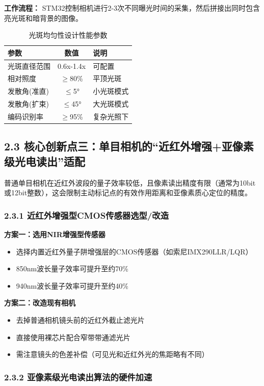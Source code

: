 \documentclass[12pt,a4paper]{article}
\begin{document}
\textbf{工作流程：} STM32控制相机进行2-3次不同曝光时间的采集，然后拼接出同时包含亮光斑和暗背景的图像。

\begin{table}[H]
\centering
\caption{光斑均匀性设计性能参数}
\begin{tabular}{lcl}
\toprule
参数 & 数值 & 说明 \\
\midrule
光斑直径范围 & 0.6x-1.4x & 可配置 \\
相对照度 & $\ge$80\% & 平顶光斑 \\
发散角(准直) & $\le$5° & 小光斑模式 \\
发散角(扩束) & $\le$45° & 大光斑模式 \\
编码识别率 & $\ge$95\% & 复杂光照下 \\
\bottomrule
\end{tabular}
\end{table}

\subsection{2.3 核心创新点三：单目相机的``近红外增强+亚像素级光电读出''适配}

普通单目相机在近红外波段的量子效率较低，且像素读出精度有限（通常为10bit或12bit整数），这会限制主动标记点的有效作用距离和亚像素质心定位的精度。

\subsubsection{2.3.1 近红外增强型CMOS传感器选型/改造}

\textbf{方案一：选用NIR增强型传感器}
\begin{itemize}
\item 选择内置近红外量子阱增强层的CMOS传感器（如索尼IMX290LLR/LQR）
\item 850nm波长量子效率可提升至约70\%
\item 940nm波长量子效率可提升至约40\%
\end{itemize}

\textbf{方案二：改造现有相机}
\begin{itemize}
\item 去掉普通相机镜头前的近红外截止滤光片
\item 直接使用裸芯片配合窄带带通滤光片
\item 需注意镜头的色差补偿（可见光和近红外光的焦距略有不同）
\end{itemize}

\subsubsection{2.3.2 亚像素级光电读出算法的硬件加速}
\end{document}
